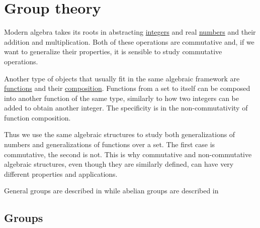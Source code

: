 \section{Group theory}\label{sec:group_theory}

\begin{remark}\label{remark:numbers_vs_endomorphisms_generalizations}
  Modern algebra takes its roots in abstracting \hyperref[def:integers]{integers} and real \hyperref[def:real_numbers]{numbers} and their addition and multiplication. Both of these operations are commutative and, if we want to generalize their properties, it is sensible to study commutative operations.

  Another type of objects that usually fit in the same algebraic framework are \hyperref[def:function]{functions} and their \hyperref[def:function/composition]{composition}. Functions from a set to itself can be composed into another function of the same type, similarly to how two integers can be added to obtain another integer. The specificity is in the non-commutativity of function composition.

  Thus we use the same algebraic structures to study both generalizations of numbers and generalizations of functions over a set. The first case is commutative, the second is not. This is why commutative and non-commutative algebraic structures, even though they are similarly defined, can have very different properties and applications.

  General groups are described in  while abelian groups are described in 
\end{remark}

\subsection{Groups}\label{subsec:groups}

